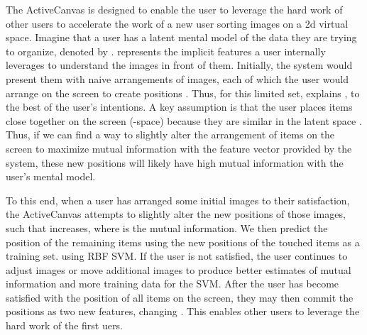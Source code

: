 \documentclass[journal]{vgtc}
\newcommand{\remove}[1]{}
\begin{document}
The ActiveCanvas is designed to enable the user to leverage the hard work of other users to accelerate the work of a new user sorting images on a 2d virtual space.  Imagine that a user has a latent mental model of the data they are trying to organize, denoted by .  represents the implicit features a user internally leverages to understand the images in front of them. Initially, the system would present them with naive arrangements of images, each of which the user would arrange on the screen to create positions .  Thus, for this limited set,  explains , to the best of the user's intentions. \remove{Information theoretic measures are promising objective functions to evaluate this explanatory power, although they are by no means the only tool at our disposal. Information theoretic methods are often invariant to invertible transformations, so the user doesn't need to generate a model for converting  into  nor does the system need to know this mapping to optimize mutual information.} A key assumption is that the user places items close together on the screen (-space) because they are similar in the latent space .  Thus, if we can find a way to slightly alter the arrangement of items on the screen to maximize mutual information with the feature vector provided by the system, these new positions will likely have high mutual information with the user's mental model.  \remove{That is, the new arrangement of items on the screen explains the user's mental model, and the user's mental model explains the arrangement on the screen.}


To this end, when a user has arranged some initial images to their satisfaction, the ActiveCanvas attempts to slightly alter the new positions of those images,  such that  increases, where  is the mutual information. We then predict the position of the remaining items using the new positions of the touched items as a training set. using RBF SVM.  If the user is not satisfied, the user continues to adjust images or move additional images to produce better estimates of mutual information and more training data for the SVM. After the user has become satisfied with the position of all items on the screen, they may then commit the positions as two new features, changing . This enables other users to leverage the hard work of the first uers.
\remove{
Both strategies rely on ActiveCanvas being provided feature-vectors for each item that can capture the user's mental model. If, as an extreme example, the feature-vectors are merely randomly generated numbers with no meaningful relation to the underlying content, no system will be able to aide a user, as it will have no information.  The user would be forced to interact with every item of interest.  More realistically, the user should assume that the underlying feature set is good, but not sufficient, for capturing the desired criteria.\footnote{For example,  text is frequently analyzed as a ``bag-of-words," disregarding the word order. This means the system can easily capture the difference between ``My dog ate the food" and ``My cat ate the food," but it can not distinguish between ``my dog ate my cat" and ``my cat ate my dog."} 
}
\end{document}
